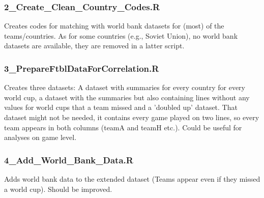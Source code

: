 \documentclass[10pt,a4paper,notitlepage,onecolumn]{article}
\begin{document}
\begin{raggedright}
\subsubsection*{2\_Create\_Clean\_Country\_Codes.R}
Creates codes for matching with world bank datasets for (most) of the teams/countries. As for some countries (e.g., Soviet Union), no world bank datasets are available, they are removed in a latter script. 
\subsubsection*{3\_PrepareFtblDataForCorrelation.R}
Creates three datasets: A dataset with summaries for every country for every world cup, a dataset with the summaries but also containing lines without any values for world cups that a team missed and a 'doubled up' dataset. That dataset might not be needed, it contains every game played on two lines, so every team appears in both columns (teamA and teamH etc.). Could be useful for analyses on game level. 

\subsubsection*{4\_Add\_World\_Bank\_Data.R}
Adds world bank data to the extended dataset (Teams appear even if they missed a world cup). 
Should be improved. 




\end{raggedright}
\end{document}
